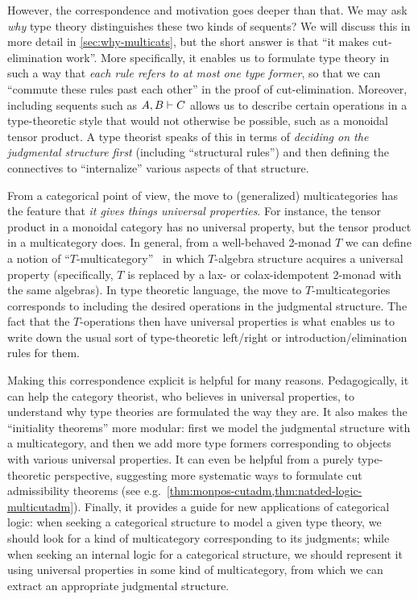 However, the correspondence and motivation goes deeper than that.
We may ask \emph{why} type theory distinguishes these two kinds of sequents?
We will discuss this in more detail in \cref{sec:why-multicats}, but the short answer is that ``it makes cut-elimination work''.
More specifically, it enables us to formulate type theory in such a way that \emph{each rule refers to at most one type former}, so that we can ``commute these rules past each other'' in the proof of cut-elimination.
Moreover, including sequents such as $A,B\vdash C$ allows us to describe certain operations in a type-theoretic style that would not otherwise be possible, such as a monoidal tensor product.
A type theorist speaks of this in terms of \emph{deciding on the judgmental structure first} (including ``structural rules'') and then defining the connectives to ``internalize'' various aspects of that structure.

From a categorical point of view, the move to (generalized) multicategories has the feature that \emph{it gives things universal properties}.
For instance, the tensor product in a monoidal category has no universal property, but the tensor product in a multicategory does.
In general, from a well-behaved 2-monad $T$ we can define a notion of ``$T$-multicategory''~\cite{burroni:t-cats,leinster:higher-opds,hermida:coh-univ,cs:multicats} in which $T$-algebra structure acquires a universal property (specifically, $T$ is replaced by a lax- or colax-idempotent 2-monad with the same algebras).
In type theoretic language, the move to $T$-multicategories corresponds to including the desired operations in the judgmental structure.
The fact that the $T$-operations then have universal properties is what enables us to write down the usual sort of type-theoretic left/right or introduction/elimination rules for them.

Making this correspondence explicit is helpful for many reasons.
Pedagogically, it can help the category theorist, who believes in universal properties, to understand why type theories are formulated the way they are.
It also makes the ``initiality theorems'' more modular: first we model the judgmental structure with a multicategory, and then we add more type formers corresponding to objects with various universal properties.
It can even be helpful from a purely type-theoretic perspective, suggesting more systematic ways to formulate cut admissibility theorems (see e.g.\ \cref{thm:monpos-cutadm,thm:natded-logic-multicutadm}). %
Finally, it provides a guide for new applications of categorical logic: when seeking a categorical structure to model a given type theory, we should look for a kind of multicategory corresponding to its judgments; while when seeking an internal logic for a categorical structure, we should represent it using universal properties in some kind of multicategory, from which we can extract an appropriate judgmental structure.

